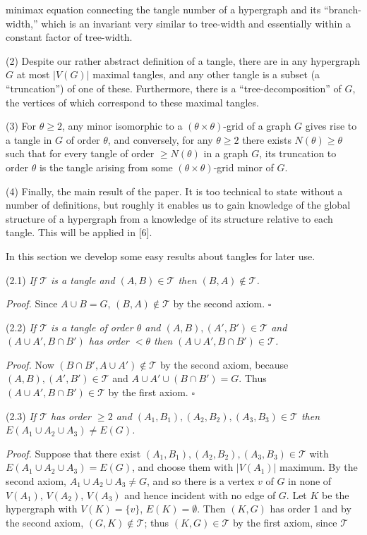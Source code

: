 \noindent minimax equation connecting the tangle number of a hypergraph and its ``branch-width,'' which is an invariant very similar to tree-width and essentially within a constant factor of tree-width.

\hspace*{12pt}(2) Despite our rather abstract definition of a tangle, there are in any hypergraph $G$ at most $|V(G)|$ maximal tangles, and any other tangle is a subset (a ``truncation'') of one of these. Furthermore, there is a ``tree-decomposition'' of $G$, the vertices of which correspond to these maximal tangles.

\hspace*{12pt}(3) For $\theta \ge 2$, any minor isomorphic to a $(\theta \times \theta)$-grid of a graph $G$ gives rise to a tangle in $G$ of order $\theta$, and conversely, for any $\theta \ge 2$ there exists $N(\theta) \ge \theta$ such that for every tangle of order $\ge N(\theta)$ in a graph $G$, its truncation to order $\theta$ is the tangle arising from some $(\theta \times \theta)$-grid minor of $G$.

\hspace*{12pt}(4) Finally, the main result of the paper. It is too technical to state without a number of definitions, but roughly it enables us to gain knowledge of the global structure of a hypergraph from a knowledge of its structure relative to each tangle. This will be applied in [6].


In this section we develop some easy results about tangles for later use.

\stmt
(2.1) \textit{If $\mathscr{T}$ is a tangle and $(A, B) \in \mathscr{T}$ then $(B, A) \notin \mathscr{T}$.}

\textit{Proof.} Since $A \cup B = G$, $(B, A) \notin \mathscr{T}$ by the second axiom. $\square$

\stmt
(2.2) \textit{If $\mathscr{T}$ is a tangle of order $\theta$ and $(A, B), (A', B') \in \mathscr{T}$ and $(A \cup A', B \cap B')$ has order $< \theta$ then $(A \cup A', B \cap B') \in \mathscr{T}$.}

\textit{Proof.} Now $(B \cap B', A \cup A') \notin \mathscr{T}$ by the second axiom, because $(A, B), (A', B') \in \mathscr{T}$ and $A \cup A' \cup (B \cap B') = G$. Thus $(A \cup A', B \cap B') \in \mathscr{T}$ by the first axiom. $\square$

\stmt
(2.3) \textit{If $\mathscr{T}$ has order $\ge 2$ and $(A_1, B_1), (A_2, B_2), (A_3, B_3) \in \mathscr{T}$ then $E(A_1 \cup A_2 \cup A_3) \ne E(G)$.}

\textit{Proof.} Suppose that there exist $(A_1, B_1), (A_2, B_2), (A_3, B_3) \in \mathscr{T}$ with $E(A_1 \cup A_2 \cup A_3) = E(G)$, and choose them with $|V(A_1)|$ maximum. By the second axiom, $A_1 \cup A_2 \cup A_3 \ne G$, and so there is a vertex $v$ of $G$ in none of $V(A_1)$, $V(A_2)$, $V(A_3)$ and hence incident with no edge of $G$. Let $K$ be the hypergraph with $V(K) = \{v\}$, $E(K) = \emptyset$. Then $(K, G)$ has order 1 and by the second axiom, $(G, K) \notin \mathscr{T}$; thus $(K, G) \in \mathscr{T}$ by the first axiom, since $\mathscr{T}$
